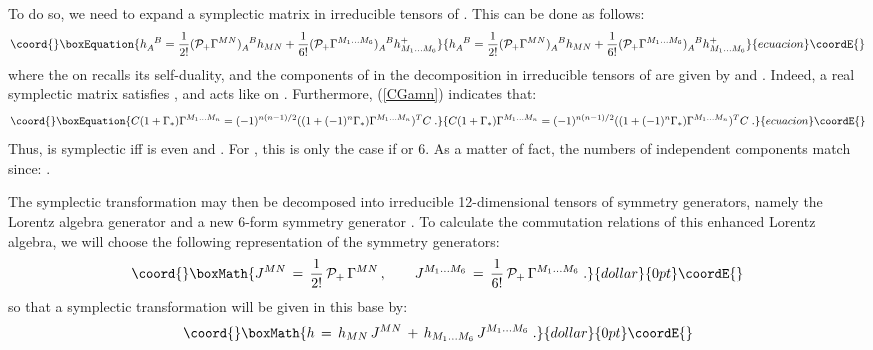 \documentclass[a4paper,11pt]{article}
\begin{document}
To do so, we need to expand a symplectic matrix in irreducible tensors 
of \coordHE{}. This can be done as follows:
\begin{equation}\coord{}\boxEquation{\label{h12}
h_A^{\phantom{A}B} = 
\frac{1}{2!} ({\cal P}_+ \Gamma^{MN})_A^{\phantom{A}B} h_{MN} + 
\frac{1}{6!} ({\cal P}_+ \Gamma^{M_1 \ldots M_6})_A^{\phantom{A}B} h^+_{M_1 \ldots M_6}
}{h_A^{\phantom{A}B} = 
\frac{1}{2!} ({\cal P}_+ \Gamma^{MN})_A^{\phantom{A}B} h_{MN} + 
\frac{1}{6!} ({\cal P}_+ \Gamma^{M_1 \ldots M_6})_A^{\phantom{A}B} h^+_{M_1 \ldots M_6}
}{ecuacion}\coordE{}\end{equation}
where the \myHighlight{$+$}\coordHE{} on \coordHE{} recalls its self-duality, and the components of \coordHE{} in 
the decomposition in irreducible tensors of \coordHE{} are given by  
\coordHE{} and 
\coordHE{} 
\linebreak {}\coordHE{}.
Indeed, a real symplectic \coordHE{} matrix satisfies \coordHE{},
and \coordHE{} acts like \coordHE{} on \coordHE{}. Furthermore, (\ref{CGamn})
indicates that: 
\begin{equation}\coord{}\boxEquation{
C (1 + \Gamma_{*}) \Gamma^{M_1 \ldots M_n} = (-1)^{n(n-1)/2} ((1 + (-1)^n \Gamma_{*}) \Gamma^{M_1 \ldots M_n})^T C \;.
}{
C (1 + \Gamma_{*}) \Gamma^{M_1 \ldots M_n} = (-1)^{n(n-1)/2} ((1 + (-1)^n \Gamma_{*}) \Gamma^{M_1 \ldots M_n})^T C \;.
}{ecuacion}\coordE{}\end{equation} 
Thus, \coordHE{} is symplectic iff \coordHE{} is even and \coordHE{}.
For \coordHE{}, this is only the case if \coordHE{} or 6. As a matter of fact, the numbers of independent components
match since: \coordHE{}.

The symplectic transformation \coordHE{} may then be decomposed
into irreducible 12-dimensional tensors of symmetry generators, namely the \coordHE{}  
Lorentz algebra generator \coordHE{}  and a new 6-form symmetry generator \coordHE{}. 
To calculate the commutation relations of this enhanced Lorentz
algebra, we will choose the following representation of the symmetry generators:
$$\coord{}\boxMath{
J^{MN} \,=\, \frac{1}{2!}\,{\cal P_+}\,\Gamma^{MN}\,,
\qquad J^{M_1 \ldots M_6} \,=\, \frac{1}{6!}\,{\cal P_+}\,\Gamma^{M_1 \ldots M_6}\;.
}{dollar}{0pt}\coordE{}$$
so that a symplectic transformation will be given in this base by:
$$\coord{}\boxMath{
h\,=\,h_{MN}\,J^{MN}\,+\,h_{M_1 \ldots M_6}\,J^{M_1 \ldots M_6}\;.
}{dollar}{0pt}\coordE{}$$
\end{document}
